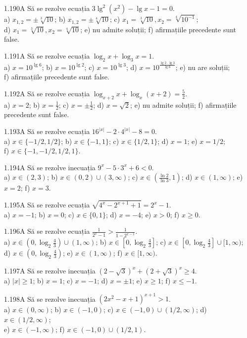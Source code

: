 \documentclass[11pt]{article}
\begin{document}
1.190A Să se rezolve ecuația $3 \lg ^{2}\left(x^{2}\right)-\lg x-1=0$.\\ a) $x_{1,2}= \pm \sqrt[3]{10}$; b) $x_{1,2}= \pm \sqrt[4]{10}$; c) $x_{1}=\sqrt[3]{10}, x_{2}=\sqrt[4]{10^{-1}}$;\\ d) $x_{1}=\sqrt[3]{10}, x_{2}=\sqrt[4]{10}$; e) nu admite soluții; f) afirmațiile precedente sunt false.

1.191A Să se rezolve ecuația $\log _{2} x+\log _{3} x=1$.\\ a) $x=10^{\lg 6}$; b) $x=10^{\lg 2}$; c) $x=10^{\lg 3}$; d) $x=10^{\frac{\lg 2 \cdot \lg 3}{\lg 6}}$; e) nu are soluții;\\ f) afirmațiile precedente sunt false.

1.192A Să se rezolve ecuația $\log _{x+2} x+\log _{x}(x+2)=\frac{5}{2}$.\\ a) $x=2$; b) $x=\frac{1}{2}$; c) $x= \pm \frac{1}{2}$; d) $x=\sqrt{2}$; e) nu admite soluții; f) afirmațiile precedente sunt false.

1.193A Să se rezolve ecuația $16^{|x|}-2 \cdot 4^{|x|}-8=0$.\\ a) $x \in\{-1 / 2,1 / 2\}$; b) $x \in\{-1,1\}$; c) $x \in\{1 / 2,1\}$; d) $x=1$; e) $x=1 / 2$;\\ f) $x \in\{-1,-1 / 2,1 / 2,1\}$.

1.194A Să se rezolve inecuația $9^{x}-5 \cdot 3^{x}+6<0$.\\ a) $x \in(2,3)$; b) $x \in(0,2) \cup(3, \infty)$; c) $x \in\left(\frac{\ln 2}{\ln 3}, 1\right)$; d) $x \in(1, \infty)$; e) $x=2$; f) $x=3$.

1.195A Să se rezolve ecuația $\sqrt{4^{x}-2^{x+1}+1}=2^{x}-1$.\\ a) $x=-1$; b) $x=0$; c) $x \in\{0,1\}$; d) $x=-4$; e) $x>0$; f) $x \geq 0$.

1.196A Să se rezolve ecuația $\frac{1}{2^{x}-1}>\frac{1}{1-2^{x-1}}$.\\ a) $x \in\left(0, \log _{2} \frac{4}{3}\right) \cup(1, \infty)$; b) $x \in\left[0, \log _{2} \frac{4}{3}\right]$; c) $x \in\left[0, \log _{2} \frac{4}{3}\right] \cup[1, \infty)$;\\ d) $x \in\left(0, \log _{2} \frac{4}{3}\right)$; e) $x \in(1, \infty)$; f) $x \in[1, \infty)$.

1.197A Să se rezolve inecuația $(2-\sqrt{3})^{x}+(2+\sqrt{3})^{x} \geq 4$.\\ a) $|x| \geq 1$; b) $x=1$; c) $x=-1$; d) $x= \pm 1$; e) $x \geq 1$; f) $x \leq-1$.

1.198A Să se rezolve inecuația $\left(2 x^{2}-x+1\right)^{x+1}>1$.\\ a) $x \in(0, \infty)$; b) $x \in(-1,0)$; c) $x \in(-1,0) \cup(1 / 2, \infty)$; d) $x \in(1 / 2, \infty)$;\\ e) $x \in(-1, \infty)$; f) $x \in(-1,0) \cup(1 / 2,1)$.
\end{document}

